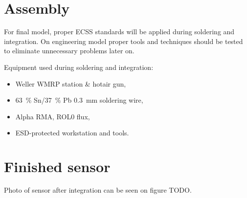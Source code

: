 \section{Assembly}
    For final model, proper ECSS standards will be applied during soldering and integration. On engineering model proper tools and techniques should be tested to eliminate unnecessary problems later on.

    Equipment used during soldering and integration:
    \begin{itemize}
        \item Weller WMRP station \& hotair gun,
        \item \SI{63}{\percent} Sn/\SI{37}{\percent} Pb \SI{0.3}{\milli\meter} soldering wire,
        \item Alpha RMA, ROL0 flux,
        \item ESD-protected workstation and tools.
    \end{itemize}

\section{Finished sensor}
    Photo of sensor after integration can be seen on figure TODO.

